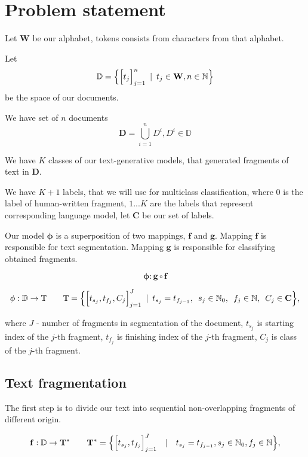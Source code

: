 \documentclass{article}
\newcommand{\Hquad}{\hspace{0.5em}}
\begin{document}
\section{Problem statement}

Let $\mathbf{W}$ be our alphabet, tokens consists from characters from that alphabet.

Let $$\mathbb{D} = \Bigl\{\Big[t_j\Big]_{j=1}^n \Hquad|\Hquad t_j \in \mathbf{W}, n \in \mathbb{N}\Bigr\}$$ be the space of our documents.

We have set of $n$ documents
$$\mathbf{D} = \bigcup_{i=1}^{n}D^i, D^i \in \mathbb{D}$$

We have $K$ classes of our text-generative models, that generated fragments of text in $\mathbf{D}$.

We have $K + 1$ labels, that we will use for multiclass classification, where $0$ is the label of human-written fragment, ${1...K}$ are the  labels that represent corresponding language model, let $\mathbf{C}$ be our set of labels.

Our model $\mathbf{\phi}$ is a superposition of two mappings, $\mathbf{f}$ and $\mathbf{g}$. Mapping $\mathbf{f}$ is responsible for text segmentation. Mapping $\mathbf{g}$ is responsible for classifying obtained fragments.

$$\mathbf{\phi} : \mathbf{g} \circ \mathbf{f}$$


$$\mathbf{\phi}: \mathbb{D} \rightarrow \mathbb{T} \qquad \mathbb{T} = \Bigl\{\Big[t_{s_j}, t_{f_j}, C_j\Big]_{j = 1}^{J} \Hquad|\Hquad t_{s_j} = t_{f_{j - 1}},\Hquad s_j \in \mathbb{N}_0,\Hquad f_j \in \mathbb{N}, \Hquad C_j \in \mathbf{C}\Bigr\},$$

where $J$ - number of fragments in segmentation of the document, $t_{s_j}$ is starting index of the $j$-th fragment,  $t_{f_j}$ is finishing index of the $j$-th fragment,  $C_{j}$ is class of the $j$-th fragment.



\subsection{Text fragmentation}
The first step is to divide our text into sequential non-overlapping fragments of different origin.

$$\mathbf{f}: \mathbb{D} \rightarrow \mathbf{T}^* \qquad \mathbf{T}^* = \Bigl\{\Big[t_{s_j}, t_{f_j}\Big]_{j = 1}^{J}\quad|\quad t_{s_j} = t_{f_{j - 1}}, s_j \in \mathbb{N}_0, f_j \in \mathbb{N}\Bigr\},$$
\end{document}
